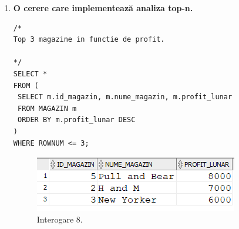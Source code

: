 \begin{enumerate}
    \item \textbf{O cerere care implementează analiza top-n.}
    \begin{lstlisting}
/*
Top 3 magazine in functie de profit.

*/
SELECT *
FROM (
 SELECT m.id_magazin, m.nume_magazin, m.profit_lunar
 FROM MAGAZIN m
 ORDER BY m.profit_lunar DESC
)
WHERE ROWNUM <= 3;

    \end{lstlisting}
    \vspace{0.2cm}
    \begin{figure}[h]
      \centerline{\includegraphics{images/interogare8.png}}
      \caption{ Interogare 8.}
    \end{figure}
\end{enumerate}
